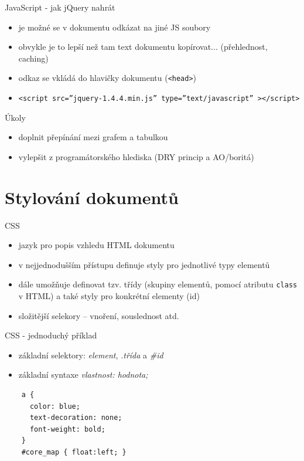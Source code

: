 \documentclass{beamer}
\begin{document}
\begin{frame}{JavaScript - jak jQuery nahrát}
  \begin{itemize}
    \item je možné se v dokumentu odkázat na jiné JS soubory
    \item obvykle je to lepší než tam text dokumentu kopírovat... (přehlednost, caching)
    \item odkaz se vkládá do hlavičky dokumentu (\texttt{<head>})
    \item \texttt{<script src=''jquery-1.4.4.min.js'' type=''text/javascript'' ></script>}
  \end{itemize}
\end{frame}

\begin{frame}{Úkoly}
  \begin{itemize}
    \item doplnit přepínání mezi grafem a tabulkou
    \item vylepšit z programátorského hlediska (DRY princip a AO/boritá)
  \end{itemize}
\end{frame}

\section{Stylování dokumentů}

\begin{frame}{CSS}
  \begin{itemize}
    \item jazyk pro popis vzhledu HTML dokumentu
    \item v nejjednodušším přístupu definuje styly pro jednotlivé typy elementů
    \item dále umožňuje definovat tzv. třídy (skupiny elementů, pomocí atributu \texttt{class} v HTML) a také styly pro konkrétní elementy (id)
    \item složitější selekory -- vnoření, souslednost atd.
  \end{itemize}
\end{frame}

\begin{frame}[fragile]{CSS - jednoduchý příklad}
  \begin{itemize}
    \item základní selektory: \emph{element}, \emph{.třída} a \emph{\#id}
    \item základní syntaxe \emph{vlastnost: hodnota;}
  \end{itemize}
  \scriptsize
  \begin{verbatim}
    a {
      color: blue;
      text-decoration: none;
      font-weight: bold;
    }
    #core_map { float:left; }
  \end{verbatim}
\end{frame}
\end{document}
